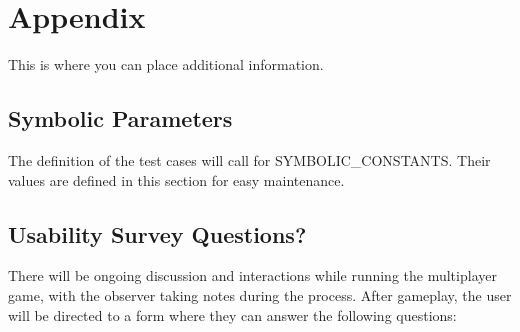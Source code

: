 \documentclass[12pt, titlepage]{article}
\begin{document}
\newpage




\newpage

\section{Appendix}

This is where you can place additional information.

\subsection{Symbolic Parameters}

The definition of the test cases will call for SYMBOLIC\_CONSTANTS.
Their values are defined in this section for easy maintenance.

\subsection{Usability Survey Questions?}

There will be ongoing discussion and interactions while running the multiplayer game, with the observer taking notes during the process. After gameplay, the user will be directed to a form where they can answer the following questions:
\end{document}
